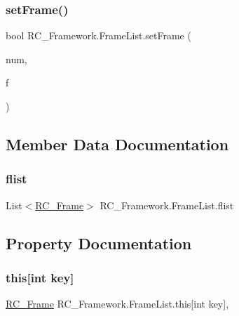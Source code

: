 \subsubsection{\texorpdfstring{set\+Frame()}{setFrame()}}
{\footnotesize\ttfamily bool R\+C\+\_\+\+Framework.\+Frame\+List.\+set\+Frame (\begin{DoxyParamCaption}\item[{int}]{num,  }\item[{\mbox{\hyperlink{class_r_c___framework_1_1_r_c___frame}{R\+C\+\_\+\+Frame}}}]{f }\end{DoxyParamCaption})}



\subsection{Member Data Documentation}
\mbox{\label{class_r_c___framework_1_1_frame_list_ac79fd51ab4e22a0ac36da0020bb1f148}} 
\subsubsection{\texorpdfstring{flist}{flist}}
{\footnotesize\ttfamily List$<$\mbox{\hyperlink{class_r_c___framework_1_1_r_c___frame}{R\+C\+\_\+\+Frame}}$>$ R\+C\+\_\+\+Framework.\+Frame\+List.\+flist}



\subsection{Property Documentation}
\mbox{\label{class_r_c___framework_1_1_frame_list_a7a404a856cc51b13a0ccecbeb07a66be}} 
\subsubsection{\texorpdfstring{this[int key]}{this[int key]}}
{\footnotesize\ttfamily \mbox{\hyperlink{class_r_c___framework_1_1_r_c___frame}{R\+C\+\_\+\+Frame}} R\+C\+\_\+\+Framework.\+Frame\+List.\+this\mbox{[}int key\mbox{]}\hspace{0.3cm}{\ttfamily [get]}, {\ttfamily [set]}}



